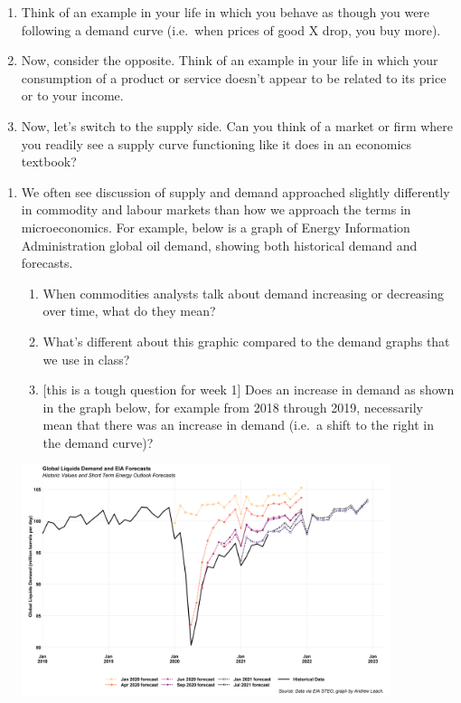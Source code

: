 \documentclass[11pt,]{article}
\providecommand{\tightlist}{%
  \setlength{\itemsep}{0pt}\setlength{\parskip}{0pt}}
\begin{document}
\begin{enumerate}
\def\labelenumi{\arabic{enumi}.}
\setcounter{enumi}{1}
\item
  Think of an example in your life in which you behave as though you
  were following a demand curve (i.e.~when prices of good X drop, you
  buy more).
\item
  Now, consider the opposite. Think of an example in your life in which
  your consumption of a product or service doesn't appear to be related
  to its price or to your income.
\item
  Now, let's switch to the supply side. Can you think of a market or
  firm where you readily see a supply curve functioning like it does in
  an economics textbook?
\end{enumerate}

\newpage

\begin{enumerate}
\def\labelenumi{\arabic{enumi}.}
\setcounter{enumi}{4}
\item
  We often see discussion of supply and demand approached slightly
  differently in commodity and labour markets than how we approach the
  terms in microeconomics. For example, below is a graph of Energy
  Information Administration global oil demand, showing both historical
  demand and forecasts.

  \begin{enumerate}
  \def\labelenumii{\alph{enumii})}
  \tightlist
  \item
    When commodities analysts talk about demand increasing or decreasing
    over time, what do they mean?
  \item
    What's different about this graphic compared to the demand graphs
    that we use in class?
  \item
    {[}this is a tough question for week 1{]} Does an increase in demand
    as shown in the graph below, for example from 2018 through 2019,
    necessarily mean that there was an increase in demand (i.e.~a shift
    to the right in the demand curve)?
  \end{enumerate}

  \centering

  \includegraphics[width=0.85\textwidth]{../images/demand.png}
\end{enumerate}
\end{document}
